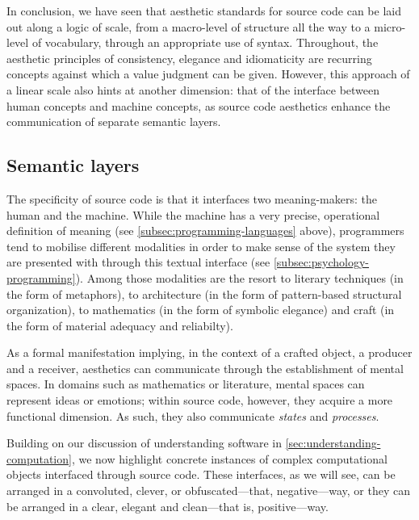In conclusion, we have seen that aesthetic standards for source code can be laid out along a logic of scale, from a macro-level of structure all the way to a micro-level of vocabulary, through an appropriate use of syntax. Throughout, the aesthetic principles of consistency, elegance and idiomaticity are recurring concepts against which a value judgment can be given. However, this approach of a linear scale also hints at another dimension: that of the interface between human concepts and machine concepts, as source code aesthetics enhance the communication of separate semantic layers.

\subsection{Semantic layers} %
\label{subsec:semantic-layers}

The specificity of source code is that it interfaces two meaning-makers: the human and the machine. While the machine has a very precise, operational definition of meaning (see \ref{subsec:programming-languages} above), programmers tend to mobilise different modalities in order to make sense of the system they are presented with through this textual interface (see \ref{subsec:psychology-programming}). Among those modalities are the resort to literary techniques (in the form of metaphors), to architecture (in the form of pattern-based structural organization), to mathematics (in the form of symbolic elegance) and craft (in the form of material adequacy and reliabilty).

As a formal manifestation implying, in the context of a crafted object, a producer and a receiver, aesthetics can communicate through the establishment of mental spaces. In domains such as mathematics or literature, mental spaces can represent ideas or emotions; within source code, however, they acquire a more functional dimension. As such, they also communicate \emph{states} and \emph{processes}.

Building on our discussion of understanding software in \ref{sec:understanding-computation}, we now highlight concrete instances of complex computational objects interfaced through source code. These interfaces, as we will see, can be arranged in a convoluted, clever, or obfuscated—that, negative—way, or they can be arranged in a clear, elegant and clean—that is, positive—way.

